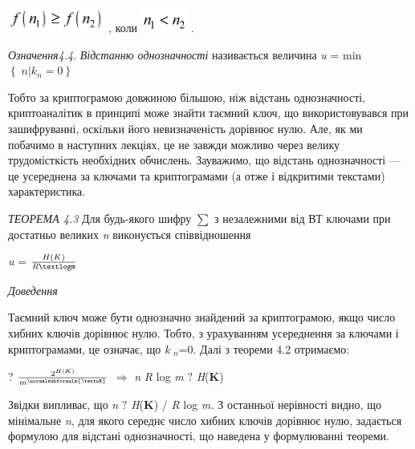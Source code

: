 {\centering
 \includegraphics[width=1.2555in,height=0.3339in]{crypt-img/crypt-img43.png} , 
коли  
\includegraphics[width=0.598in,height=0.2984in]{crypt-img/crypt-img44.png} .
\par}

\textit{Означення4.4}. \textit{Відстанню  однозначності} називається
величина\textit{  } \textit{u}\textit{ }= min 
$\left\{ \;n|k_n \right.=0\left.  \right\}$

Тобто  за криптограмою довжиною більшою, ніж відстань однозначності,
криптоаналітик в принципі може знайти таємний ключ, що використовувався при
зашифруванні, оскільки його невизначеність дорівнює нулю. Але, як ми побачимо в
наступних лекціях, це не завжди можливо через  велику трудомісткість необхідних
обчислень. Зауважимо, що відстань однозначності --- це усереднена за ключами та
криптограмами (а отже і відкритими текстами) характеристика.

\textit{ТЕОРЕМА 4.3 } Для будь-якого шифру   $\sum $ з незалежними від ВТ 
ключами  при достатньо великих \textit{n} виконується  співвідношення

{\centering
\textit{u}\textit{ }=   $\frac{H(K)}{R\textlogm}$
\par}

{\itshape
Доведення}

 Таємний ключ може бути однозначно знайдений за  криптограмою, якщо число хибних
ключів дорівнює нулю. Тобто, з урахуванням усереднення за ключами і
криптограмами, це означає, що\textit{  }\textit{k} $_n$=0. Далі з
теореми 4.2 отримаємо: 

{   $?$   $\frac{2^{H(K)}}{m^{\normalsubformula{\textnR}}}$  
$\Rightarrow $\textit{  }\textit{n}\textit{ }\textit{R}\textit{ }log
\textit{m}  $?$  \textit{H}(\textbf{K}) 
\par}


\bigskip

Звідки  випливає, що  \textit{n}  $?$  \textit{H}(\textbf{K}) / \textit{R} log
\textit{m}\textit{.}\textit{ }З останньої нерівності видно, що мінімальне
\textit{n}, для якого середнє число хибних ключів дорівнює нулю, задається
формулою для відстані однозначності, що наведена у формулюванні теореми.   $ $
$ $ 

